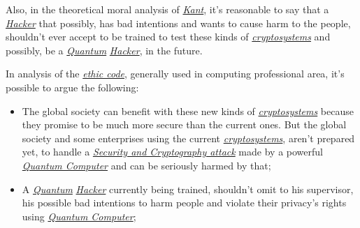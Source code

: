 \documentclass[conference]{IEEEtran}
\begin{document}
\vspace{4pt}

Also, in the theoretical moral analysis of \href{https://en.wikipedia.org/wiki/Kantianism}{\textit{Kant}}, it's reasonable to say that a \href{https://en.wikipedia.org/wiki/Hacker}{\textit{Hacker}} that possibly, has bad intentions and wants to cause harm to the people, shouldn't ever accept to be trained to test these kinds of \href{https://en.wikipedia.org/wiki/Cryptosystem}{\textit{cryptosystems}} and possibly, be a \href{https://en.wikipedia.org/wiki/Quantum}{\textit{Quantum}} \href{https://en.wikipedia.org/wiki/Hacker}{\textit{Hacker}}, in the future.

\vspace{4pt}

In analysis of the \href{https://en.wikipedia.org/wiki/Ethical_code}{\textit{ethic code}}, generally used in computing professional area, it's possible to argue the following:

\vspace{4pt}

\begin{itemize}
    \item The global society can benefit with these new kinds of \href{https://en.wikipedia.org/wiki/Cryptosystem}{\textit{cryptosystems}} because they promise to be much more secure than the current ones. But the global society and some enterprises using the current \href{https://en.wikipedia.org/wiki/Cryptosystem}{\textit{cryptosystems}}, aren't prepared yet, to handle a \href{https://en.wikipedia.org/wiki/Cryptanalysis#Amount_of_information_available_to_the_attacker}{\textit{Security and Cryptography attack}} made by a powerful \href{https://en.wikipedia.org/wiki/Quantum_computing}{\textit{Quantum Computer}} and can be seriously harmed by that;
    \item A \href{https://en.wikipedia.org/wiki/Quantum}{\textit{Quantum}} \href{https://en.wikipedia.org/wiki/Hacker}{\textit{Hacker}} currently being trained, shouldn't omit to his supervisor, his possible bad intentions to harm people and violate their privacy's rights using \href{https://en.wikipedia.org/wiki/Quantum_computing}{\textit{Quantum Computer}};
\end{itemize}

\newpage
\end{document}
